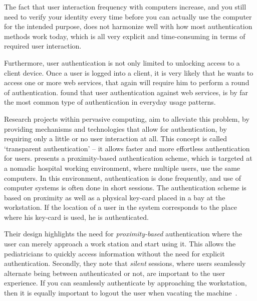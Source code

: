 

The fact that user interaction frequency with computers increase, and you still need to verify your identity every time before you can actually use the computer for the intended purpose, does not harmonize well with how most authentication methods work today, which is all very explicit and time-consuming in terms of required user interaction.

Furthermore, user authentication is not only limited to unlocking access to a client device.
Once a user is logged into a client, it is very likely that he wants to access one or more web services, that again will require him to perform a round of authentication.
\citet{hayashi2011diary} found that user authentication against web services, is by far the most common type of authentication in everyday usage patterns.


Research projects within pervasive computing, aim to alleviate this problem, by providing mechanisms and technologies that allow for authentication, by requiring only a little or no user interaction at all.
This concept is called `transparent authentication' -- it allows faster and more effortless authentication for users.
\citet{bardram2003context} presents a proximity-based authentication scheme, which is targeted at a nomadic hospital working environment, where multiple users, use the same computers.
In this environment, authentication is done frequently, and use of computer systems is often done in short sessions.
The authentication scheme is based on proximity as well as a physical key-card placed in a bay at the workstation. If the location of a user in the system corresponds to the place where his key-card is used, he is authenticated.


Their design highlights the need for \textit{proximity-based} authentication where the user can merely approach a work station and start using it.
This allows the pediatricians to quickly access information without the need for explicit authentication.
Secondly, they note that \textit{silent} sessions, where users seamlessly alternate being between authenticated or not, are important to the user experience.
If you can seamlessly authenticate by approaching the workstation, then it is equally important to logout the user when vacating the machine~\cite{bardram2005trouble}.

